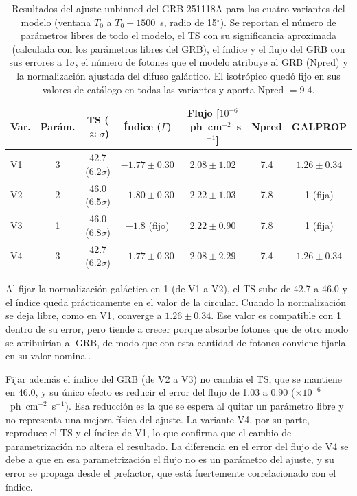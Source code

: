 \begin{table}[h!]
\centering
\caption{Resultados del ajuste unbinned del GRB 251118A para las cuatro variantes del modelo
(ventana $T_0$ a $T_0+1500$~s, radio de 15$^{\circ}$). Se reportan el número de parámetros libres de todo
el modelo, el TS con su significancia aproximada (calculada con los parámetros libres del GRB), el índice
y el flujo del GRB con sus errores a 1$\sigma$, el número de fotones que el modelo atribuye al GRB
(Npred) y la normalización ajustada del difuso galáctico. El isotrópico quedó fijo en sus valores de
catálogo en todas las variantes y aporta Npred $=9.4$.}
\label{tab:gtlike251118A}
\small
\setlength{\tabcolsep}{4.5pt}
\begin{tabular}{lcccccc}
\toprule
\textbf{Var.} & \textbf{Parám.} & \textbf{TS} ($\approx\sigma$) & \textbf{Índice} ($\Gamma$) & \textbf{Flujo [$10^{-6}$~ph~cm$^{-2}$~s$^{-1}$]} & \textbf{Npred} & \textbf{GALPROP} \\
\midrule
V1 & 3 & 42.7 (6.2$\sigma$) & $-1.77 \pm 0.30$ & $2.08 \pm 1.02$ & 7.4 & $1.26 \pm 0.34$ \\
V2 & 2 & 46.0 (6.5$\sigma$) & $-1.80 \pm 0.30$ & $2.22 \pm 1.03$ & 7.8 & 1 (fija) \\
V3 & 1 & 46.0 (6.8$\sigma$) & $-1.8$ (fijo) & $2.22 \pm 0.90$ & 7.8 & 1 (fija) \\
V4 & 3 & 42.7 (6.2$\sigma$) & $-1.77 \pm 0.30$ & $2.08 \pm 2.29$ & 7.4 & $1.26 \pm 0.34$ \\
\bottomrule
\end{tabular}
\end{table}

Al fijar la normalización galáctica en 1 (de V1 a V2), el TS sube de 42.7 a 46.0 y el índice queda
prácticamente en el valor de la circular. Cuando la normalización se deja libre, como en V1, converge a
$1.26 \pm 0.34$. Ese valor es compatible con 1 dentro de su error, pero tiende a crecer porque absorbe
fotones que de otro modo se atribuirían al GRB, de modo que con esta cantidad de fotones conviene fijarla
en su valor nominal.

Fijar además el índice del GRB (de V2 a V3) no cambia el TS, que se mantiene en 46.0, y su único efecto
es reducir el error del flujo de 1.03 a 0.90 ($\times10^{-6}$~ph~cm$^{-2}$~s$^{-1}$). Esa reducción es
la que se espera al quitar un parámetro libre y no representa una mejora física del ajuste. La variante
V4, por su parte, reproduce el TS y el índice de V1, lo que confirma que el cambio de parametrización no
altera el resultado. La diferencia en el error del flujo de V4 se debe a que en esa parametrización el
flujo no es un parámetro del ajuste, y su error se propaga desde el prefactor, que está fuertemente
correlacionado con el índice.


